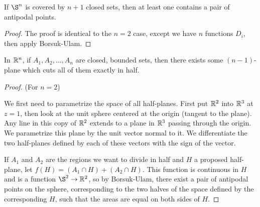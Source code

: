 
\begin{theorem}
	If $\S^n$ is covered by $n+1$ closed sets, then at least one contains a pair of antipodal points.
\end{theorem}
\begin{proof}
	The proof is identical to the $n=2$ case, except we have $n$ functions $D_i$, then apply Borsuk-Ulam.
\end{proof}

\begin{theorem}
	In $\mathbb{R}^n$, if $A_1,A_2,\dots,A_n$ are closed, bounded sets, then there exists some $(n-1)$-plane which cuts all of them exactly in half.
\end{theorem}
\begin{proof}
	(For $n=2$)
	
	We first need to parametrize the space of all half-planes.  First put $\mathbb{R}^2$ into $\mathbb{R}^3$ at $z=1$, then look at the unit sphere centered at the origin (tangent to the plane).  Any line in this copy of $\mathbb{R}^2$ extends to a plane in $\mathbb{R}^3$ passing through the origin.  We parametrize this plane by the unit vector normal to it.  We differentiate the two half-planes defined by each of these vectors with the sign of the vector.
	
	If $A_1$ and $A_2$ are the regions we want to divide in half and $H$ a proposed half-plane, let $f(H)=(A_1\cap H)+(A_2\cap H)$.  This function is continuous in $H$ and is a function $\S^2\rightarrow \R^2$, so by Borsuk-Ulam, there exist a pair of antipodal points on the sphere, corresponding to the two halves of the space defined by the corresponding $H$, such that the areas are equal on both sides of $H$.
\end{proof}
